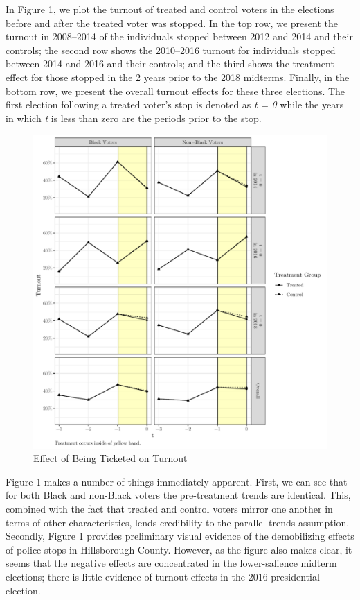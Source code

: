 \documentclass[
  12pt,
]{article}
\begin{document}
In Figure 1, we plot the turnout of treated and control voters in the elections before and after the treated voter was stopped. In the top row, we present the turnout in 2008--2014 of the individuals stopped between 2012 and 2014 and their controls; the second row shows the 2010--2016 turnout for individuals stopped between 2014 and 2016 and their controls; and the third shows the treatment effect for those stopped in the 2 years prior to the 2018 midterms. Finally, in the bottom row, we present the overall turnout effects for these three elections. The first election following a treated voter's stop is denoted as \emph{t = 0} while the years in which \emph{t} is less than zero are the periods prior to the stop.

\begin{figure}[!htb]

{\centering \includegraphics{draft_paper_files/figure-latex/did1-1} 

}

\caption{\label{fig:did-1}Effect of Being Ticketed on Turnout}\label{fig:did1}
\end{figure}

Figure 1 makes a number of things immediately apparent. First, we can see that for both Black and non-Black voters the pre-treatment trends are identical. This, combined with the fact that treated and control voters mirror one another in terms of other characteristics, lends credibility to the parallel trends assumption. Secondly, Figure 1 provides preliminary visual evidence of the demobilizing effects of police stops in Hillsborough County. However, as the figure also makes clear, it seems that the negative effects are concentrated in the lower-salience midterm elections; there is little evidence of turnout effects in the 2016 presidential election.
\end{document}
